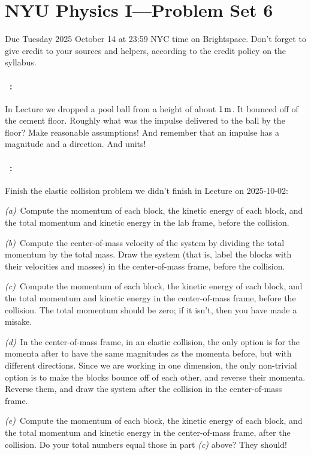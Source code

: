 \documentclass[12pt]{article}
\begin{document}
\section*{NYU Physics I---Problem Set 6}

Due Tuesday 2025 October 14 at 23:59 NYC time on Brightspace.
Don't forget to give credit to your sources and helpers, according to
the credit policy on the syllabus.

\paragraph{\problemname~\theproblem:}%
In Lecture we dropped a pool ball from a height of about $1\,\mathrm{m}$. It
bounced off of the cement floor. Roughly what was the impulse
delivered to the ball by the floor? Make reasonable assumptions! And
remember that an impulse has a magnitude and a direction. And units!

\paragraph{\problemname~\theproblem:}\label{elastic}%
Finish the elastic collision problem we didn't finish in Lecture on 2025-10-02:

\textsl{(a)}~Compute the momentum of each block, the kinetic energy of
each block, and the total momentum and kinetic energy in the lab
frame, before the collision.

\textsl{(b)}~Compute the center-of-mass velocity of the system by
dividing the total momentum by the total mass. Draw the system (that
is, label the blocks with their velocities and masses) in the
center-of-mass frame, before the collision.

\textsl{(c)}~Compute the momentum of each block, the kinetic energy of
each block, and the total momentum and kinetic energy in the
center-of-mass frame, before the collision. The total momentum should
be zero; if it isn't, then you have made a misake.

\textsl{(d)}~In the center-of-mass frame, in an elastic collision, the
only option is for the momenta after to have the same magnitudes as
the momenta before, but with different directions. Since we are
working in one dimension, the only non-trivial option is to make the
blocks bounce off of each other, and reverse their momenta. Reverse
them, and draw the system after the collision in the center-of-mass
frame.

\textsl{(e)}~Compute the momentum of each block, the kinetic energy of
each block, and the total momentum and kinetic energy in the
center-of-mass frame, after the collision. Do your total numbers equal those
in part \textsl{(c)} above? They should!
\end{document}
